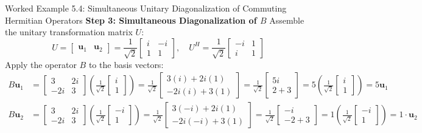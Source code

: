\begin{examplebox}{Worked Example 5.4: Simultaneous Unitary Diagonalization of Commuting Hermitian Operators}
\textbf{Step 3: Simultaneous Diagonalization of $B$}
Assemble the unitary transformation matrix $U$:
\begin{equation*}
U = \begin{bmatrix} \mathbf{u}_1 & \mathbf{u}_2 \end{bmatrix} = \frac{1}{\sqrt{2}} \begin{bmatrix} i & -i \\ 1 & 1 \end{bmatrix}, \quad U^H = \frac{1}{\sqrt{2}} \begin{bmatrix} -i & 1 \\ i & 1 \end{bmatrix}
\end{equation*}
Apply the operator $B$ to the basis vectors:
\begin{align*}
B \mathbf{u}_1 &= \begin{bmatrix} 3 & 2i \\ -2i & 3 \end{bmatrix} \left( \frac{1}{\sqrt{2}}\begin{bmatrix} i \\ 1 \end{bmatrix} \right) = \frac{1}{\sqrt{2}} \begin{bmatrix} 3(i) + 2i(1) \\ -2i(i) + 3(1) \end{bmatrix} = \frac{1}{\sqrt{2}} \begin{bmatrix} 5i \\ 2 + 3 \end{bmatrix} = 5 \left( \frac{1}{\sqrt{2}}\begin{bmatrix} i \\ 1 \end{bmatrix} \right) = 5 \mathbf{u}_1 \\
B \mathbf{u}_2 &= \begin{bmatrix} 3 & 2i \\ -2i & 3 \end{bmatrix} \left( \frac{1}{\sqrt{2}}\begin{bmatrix} -i \\ 1 \end{bmatrix} \right) = \frac{1}{\sqrt{2}} \begin{bmatrix} 3(-i) + 2i(1) \\ -2i(-i) + 3(1) \end{bmatrix} = \frac{1}{\sqrt{2}} \begin{bmatrix} -i \\ -2 + 3 \end{bmatrix} = 1 \left( \frac{1}{\sqrt{2}}\begin{bmatrix} -i \\ 1 \end{bmatrix} \right) = 1 \cdot \mathbf{u}_2

\end{align*}
\end{examplebox}

